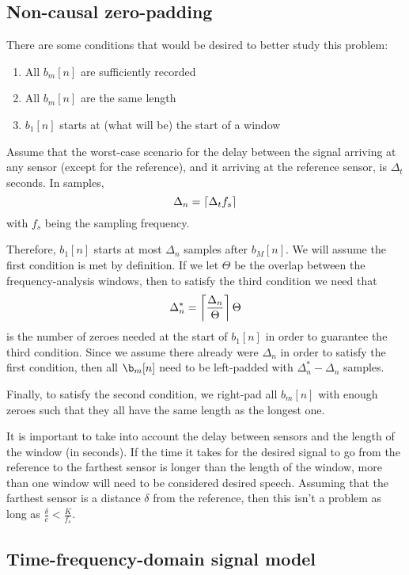 \subsection{Non-causal zero-padding}
\label{subsec:zero_padding}

There are some conditions that would be desired to better study this problem:
\begin{enumerate}
	\item All $b_m[n]$ are sufficiently recorded
	\item All $b_m[n]$ are the same length
	\item $b_1[n]$ starts at (what will be) the start of a window
\end{enumerate}

Assume that the worst-case scenario for the delay between the signal arriving at any sensor (except for the reference), and it arriving at the reference sensor, is $\Delta_t$ seconds. In samples,
\begin{equation}
\Delta_n = \left\lceil \Delta_t f_s \right\rceil
\end{equation}
with $f_s$ being the sampling frequency.

Therefore, $b_1[n]$ starts at most $\Delta_n$ samples after $b_M[n]$. We will assume the first condition is met by definition. If we let $\Theta$ be the overlap between the frequency-analysis windows, then to satisfy the third condition we need that
\begin{equation}
	\Delta_n^* = \left\lceil \frac{\Delta_n}{\Theta} \right\rceil\Theta
\end{equation}
is the number of zeroes needed at the start of $b_1[n]$ in order to guarantee the third condition. Since we assume there already were $\Delta_n$ in order to satisfy the first condition, then all $\b_m[n]$ need to be left-padded with $\Delta_n^* - \Delta_n$ samples.

Finally, to satisfy the second condition, we right-pad all $b_m[n]$ with enough zeroes such that they all have the same length as the longest one.

It is important to take into account the delay between sensors and the length of the window (in seconds). If the time it takes for the desired signal to go from the reference to the farthest sensor is longer than the length of the window, more than one window will need to be considered desired speech. Assuming that the farthest sensor is a distance $\delta$ from the reference, then this isn't a problem as long as $\frac{\delta}{c} < \frac{K}{f_s}$.

\subsection{Time-frequency-domain signal model}

